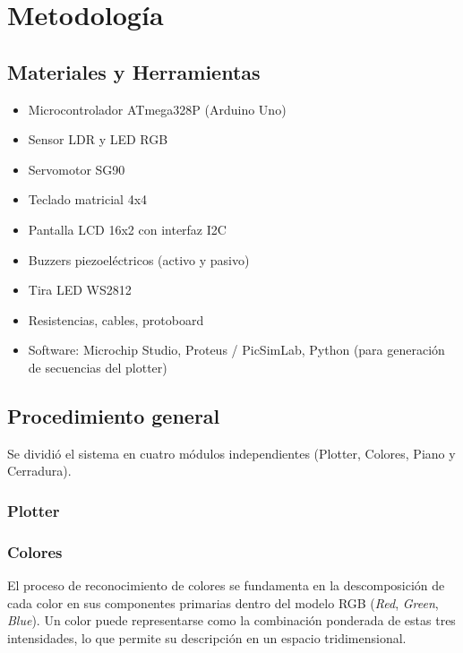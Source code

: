 \section{Metodología}

\subsection{Materiales y Herramientas}

\begin{itemize}
    \item Microcontrolador ATmega328P (Arduino Uno)
    \item Sensor LDR y LED RGB
    \item Servomotor SG90
    \item Teclado matricial 4x4
    \item Pantalla LCD 16x2 con interfaz I2C
    \item Buzzers piezoeléctricos (activo y pasivo)
    \item Tira LED WS2812
    \item Resistencias, cables, protoboard
    \item Software: Microchip Studio, Proteus / PicSimLab, Python (para generación de secuencias del plotter)
\end{itemize}

\subsection{Procedimiento general}
Se dividió el sistema en cuatro módulos independientes (Plotter, Colores, Piano y Cerradura).

\subsubsection{\textbf{Plotter}}

    \vspace{1em}
    
\subsubsection{\textbf{Colores}}
    El proceso de reconocimiento de colores se fundamenta en la descomposición de cada color en sus componentes primarias dentro del modelo RGB (\textit{Red}, \textit{Green}, \textit{Blue}). Un color puede representarse como la combinación ponderada de estas tres intensidades, lo que permite su descripción en un espacio tridimensional.  

